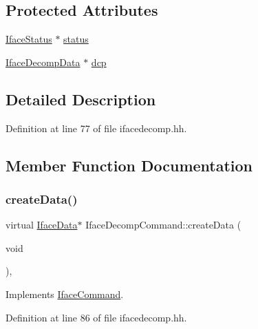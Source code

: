 \subsection*{Protected Attributes}
\begin{DoxyCompactItemize}
\item 
\mbox{\hyperlink{class_iface_status}{Iface\+Status}} $\ast$ \mbox{\hyperlink{class_iface_decomp_command_a23377b0b15a552563f0558c2c3f155f5}{status}}
\item 
\mbox{\hyperlink{class_iface_decomp_data}{Iface\+Decomp\+Data}} $\ast$ \mbox{\hyperlink{class_iface_decomp_command_a577eeaba407343565278a765a17bf4b7}{dcp}}
\end{DoxyCompactItemize}


\subsection{Detailed Description}


Definition at line 77 of file ifacedecomp.\+hh.



\subsection{Member Function Documentation}
\mbox{\label{class_iface_decomp_command_a9a4c2fccea348fbb80dc363dc6a39853}} 
\subsubsection{\texorpdfstring{createData()}{createData()}}
{\footnotesize\ttfamily virtual \mbox{\hyperlink{class_iface_data}{Iface\+Data}}$\ast$ Iface\+Decomp\+Command\+::create\+Data (\begin{DoxyParamCaption}\item[{void}]{ }\end{DoxyParamCaption})\hspace{0.3cm}{\ttfamily [inline]}, {\ttfamily [virtual]}}



Implements \mbox{\hyperlink{class_iface_command_a908e484baf6e090b46ceb2ccaea8139d}{Iface\+Command}}.



Definition at line 86 of file ifacedecomp.\+hh.

